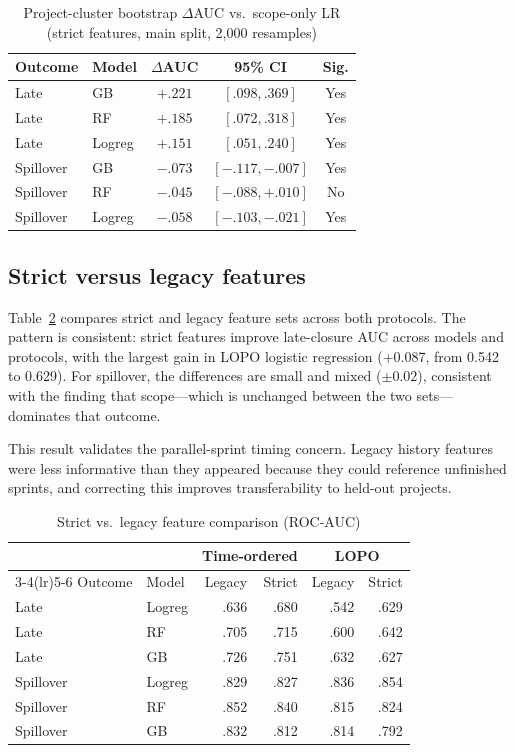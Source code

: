 \documentclass[conference]{IEEEtran}
\begin{document}
\begin{table}[!htb]
\centering\scriptsize
\caption{Project-cluster bootstrap $\Delta$AUC vs.\ scope-only LR (strict features, main split, 2{,}000 resamples)}
\label{tab:cluster}
\setlength{\tabcolsep}{3.0pt}
\begin{tabular}{@{}llccc@{}}
\toprule
Outcome & Model & $\Delta$AUC & 95\% CI & Sig.\\
\midrule
Late & GB        & $+.221$ & $[.098,.369]$ & Yes\\
Late & RF        & $+.185$ & $[.072,.318]$ & Yes\\
Late & Logreg    & $+.151$ & $[.051,.240]$ & Yes\\
Spillover & GB   & $-.073$ & $[-.117,-.007]$ & Yes\\
Spillover & RF   & $-.045$ & $[-.088,+.010]$ & No\\
Spillover & Logreg & $-.058$ & $[-.103,-.021]$ & Yes\\
\bottomrule
\end{tabular}
\end{table}

\subsection{Strict versus legacy features}
\label{sec:strictlegacy}

Table~\ref{tab:strictlegacy} compares strict and legacy feature sets across both protocols.
The pattern is consistent: strict features improve late-closure AUC across models and protocols, with the largest gain in LOPO logistic regression (+0.087, from 0.542 to 0.629).
For spillover, the differences are small and mixed ($\pm 0.02$), consistent with the finding that scope---which is unchanged between the two sets---dominates that outcome.

This result validates the parallel-sprint timing concern.
Legacy history features were less informative than they appeared because they could reference unfinished sprints, and correcting this improves transferability to held-out projects.

\begin{table}[!htb]
\centering\scriptsize
\caption{Strict vs.\ legacy feature comparison (ROC-AUC)}
\label{tab:strictlegacy}
\setlength{\tabcolsep}{2.2pt}
\begin{tabular}{@{}llrrrr@{}}
\toprule
 &  & \multicolumn{2}{c}{Time-ordered} & \multicolumn{2}{c}{LOPO}\\
\cmidrule(lr){3-4}\cmidrule(lr){5-6}
Outcome & Model & Legacy & Strict & Legacy & Strict\\
\midrule
Late & Logreg & .636 & .680 & .542 & .629\\
Late & RF & .705 & .715 & .600 & .642\\
Late & GB & .726 & .751 & .632 & .627\\
\midrule
Spillover & Logreg & .829 & .827 & .836 & .854\\
Spillover & RF & .852 & .840 & .815 & .824\\
Spillover & GB & .832 & .812 & .814 & .792\\
\bottomrule
\end{tabular}
\end{table}
\end{document}
